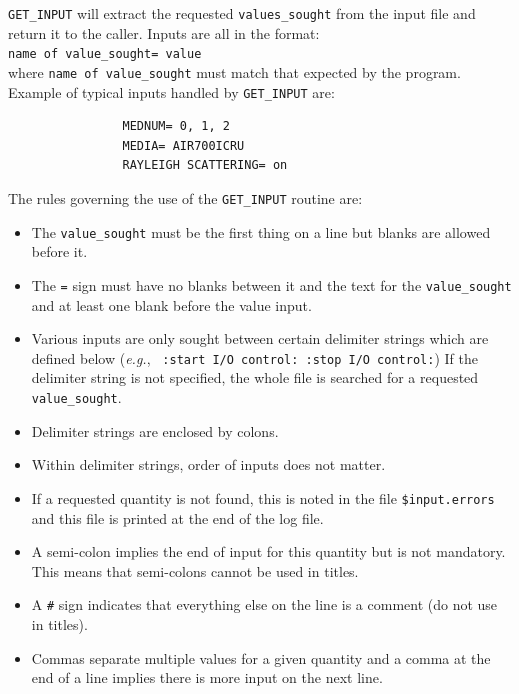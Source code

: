 \documentclass[12pt,twoside]{article}  %
\begin{document}
\verb+GET_INPUT+ will extract the requested 
\verb+values_sought+ from the input file and return it to the 
caller. Inputs are all in the format:\\
 \verb+name of value_sought= value+\\
where \verb+name of value_sought+ must match that expected by the
program.  Example of typical inputs handled by \verb+GET_INPUT+ are:
\begin{verbatim}
                MEDNUM= 0, 1, 2
                MEDIA= AIR700ICRU
                RAYLEIGH SCATTERING= on
\end{verbatim}
The rules governing the use of the {\tt GET\_INPUT} routine are:
\begin{itemize} 
\item The \verb+value_sought+ must be the first thing on a line but 
blanks are allowed before it.

\item The {\tt =} sign must have no blanks between it and the text for
the \verb+value_sought+ and at least one blank before the value input.

\item Various inputs are only sought between certain delimiter strings
which are defined below ({\em e.g.},
\verb+ :start I/O control: :stop I/O control:+)
If the delimiter string is not specified, the whole file is searched for 
a requested \verb+value_sought+.

\item Delimiter strings are enclosed by colons.

\item Within delimiter strings, order of inputs does not matter.

\item If a requested quantity is not found, this is noted in the file
\verb+$input.errors+ and this file is printed at the end of the log file.

\item A semi-colon implies the end of input for this quantity but is
not mandatory.  This means that semi-colons cannot be used in titles.

\item A \verb+#+ sign indicates that everything else on the line is a 
comment (do not use in titles).

\item Commas separate multiple values for a given quantity and a comma
at the end of a line implies there is more input on the next line.


\end{itemize}
\end{document}
